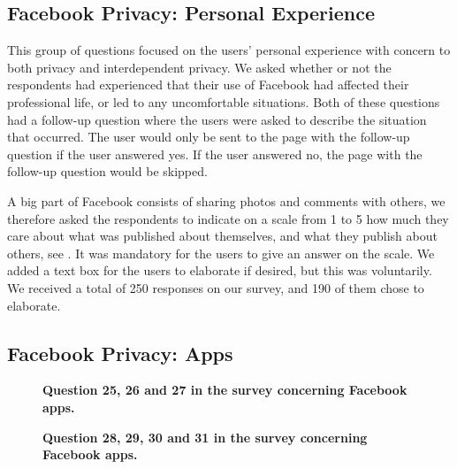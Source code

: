 \subsection{Facebook Privacy: Personal Experience}

This group of questions focused on the users' personal experience with concern to both privacy and interdependent privacy. We asked whether or not the respondents had experienced that their use of Facebook had affected their professional life, or led to any uncomfortable situations. Both of these questions had a follow-up question where the users were asked to describe the situation that occurred. The user would only be sent to the page with the follow-up question if the user answered yes. If the user answered no, the page with the follow-up question would be skipped. 

A big part of Facebook consists of sharing photos and comments with others, we therefore asked the respondents to indicate on a scale from 1 to 5 how much they care about what was published about themselves, and what they publish about others, see . It was mandatory for the users to give an answer on the scale. We added a text box for the users to elaborate if desired, but this was voluntarily. We received a total of 250 responses on our survey, and 190 of them chose to elaborate. 

\subsection{Facebook Privacy: Apps}

\begin{figure}[t]
\centering
{}
\caption[Question 25, 26 and 27 in the survey concerning Facebook apps]{\textbf{Question 25, 26 and 27 in the survey concerning Facebook apps.}} 
\label{fig:page14}
\end{figure}

\begin{figure}[t]
\centering
{}
\caption[Question 28, 29, 30 and 31 in the survey concerning Facebook apps]{\textbf{Question 28, 29, 30 and 31 in the survey concerning Facebook apps.}} 
\label{fig:page15}
\end{figure}

